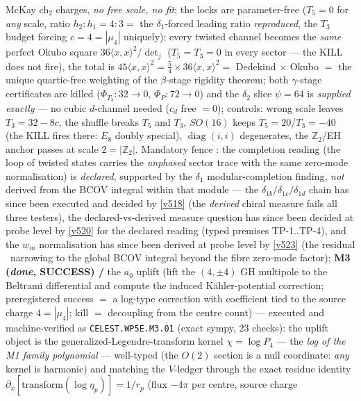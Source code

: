 \documentclass[11pt,a4paper]{article}
\newcommand{\Z}{\mathbb Z}
\begin{document}
\begin{itemize}
\begin{itemize}
McKay ch$_2$ charges, \emph{no free scale, no fit}; the locks are parameter-free ($T_5=0$ for
\emph{any} scale, ratio $h_2{:}h_1=4{:}3=$ the $\delta_1$-forced leading ratio \emph{reproduced},
the $T_3$ budget forcing $c=4=|\mu_4|$ uniquely); every twisted channel becomes the \emph{same}
perfect Okubo square $36\langle x,x\rangle^2/\det_j$ ($T_5=T_3=0$ in every sector --- the KILL
does not fire), the total is $45\langle x,x\rangle^2=\tfrac54\times36\langle x,x\rangle^2=$
Dedekind $\times$ Okubo $=$ the unique quartic-free weighting of the $\beta$-stage rigidity
theorem; both $\gamma$-stage certificates are killed ($\Phi_{T_3}\!:32\to0$, $\Phi_P\!:72\to0$)
and the $\delta_2$ slice $\psi=64$ is \emph{supplied exactly} --- no cubic $d$-channel needed
($c_d$ free $=0$); controls: wrong scale leaves $T_3=32-8c$, the shuffle breaks $T_5$ and $T_3$,
$SO(16)$ keeps $T_5=20$/$T_3=-40$ (the KILL fires there: $E_8$ doubly special),
$\operatorname{diag}(i,i)$ degenerates, the $\Z_2$/EH anchor passes at scale $2=|\Z_2|$.
Mandatory fence \mC: the completion reading (the loop of twisted states carries the
\emph{unphased} sector trace with the same zero-mode normalisation) is \emph{declared},
supported by the $\delta_1$ modular-completion finding, \emph{not} derived from the BCOV
integral within that module --- the $\delta_{1b}/\delta_{1c}/\delta_{1d}$ chain has since been
executed and decided by \vref{v518} (the \emph{derived} chiral measure fails all three testers),
the declared-vs-derived measure question has since been decided at probe level by
\vref{v520} for the declared reading (typed premises TP-1..TP-4), and the $w_m$ normalisation
has since been derived at probe level by \vref{v523} (the residual \mO\ narrowing to the
global BCOV integral beyond the fibre zero-mode factor);
\textbf{M3 (\emph{done}, SUCCESS) \mE/\mC} the $a_0$ uplift (lift the $(4,\pm4)$ GH
multipole to the Beltrami differential and compute the induced K\"ahler-potential correction;
preregistered success $=$ a log-type correction with coefficient tied to the source charge
$4=|\mu_4|$; kill $=$ decoupling from the centre count) --- executed and machine-verified as
\texttt{CELEST.WP5E.M3.01}  (exact sympy, $23$
checks): the uplift object is the generalized-Legendre-transform kernel $\chi=\log P_4$ --- the
\emph{log of the M1 family polynomial} --- well-typed (the $O(2)$ section is a null coordinate:
\emph{any} kernel is harmonic) and matching the $V$-ledger through the exact residue identity
$\partial_x[\mathrm{transform}(\log\eta_p)]=1/r_p$ (flux $-4\pi$ per centre, source charge

\end{itemize}
\end{itemize}
\end{document}
